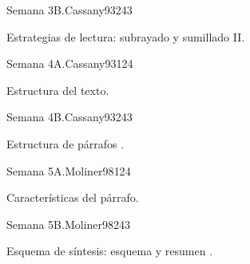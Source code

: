 \begin{syllabus}
\begin{unit}{Semana 3B.}{Cassany93}{24}{3}
   \begin{topics}
      \item Estrategias de lectura: subrayado y sumillado II.
   \end{topics}

   \begin{learningoutcomes}
      \item 
      \item
      \item 
      \end{learningoutcomes}
\end{unit}

\begin{unit}{Semana 4A.}{Cassany93}{12}{4}
   \begin{topics}
      \item Estructura del texto.
   \end{topics}
   \begin{learningoutcomes}
      \item 
   \end{learningoutcomes}
\end{unit}

\begin{unit}{Semana 4B.}{Cassany93}{24}{3}
   \begin{topics}
      \item Estructura de párrafos .
   \end{topics}

   \begin{learningoutcomes}
      \item 
      \item
      \item 
      \end{learningoutcomes}
\end{unit}

\begin{unit}{Semana 5A.}{Moliner98}{12}{4}
   \begin{topics}
      \item Características del párrafo.
   \end{topics}
   \begin{learningoutcomes}
      \item 
   \end{learningoutcomes}
\end{unit}

\begin{unit}{Semana 5B.}{Moliner98}{24}{3}
   \begin{topics}
      \item Esquema de síntesis: esquema y resumen .
   \end{topics}


\end{unit}
\end{syllabus}
